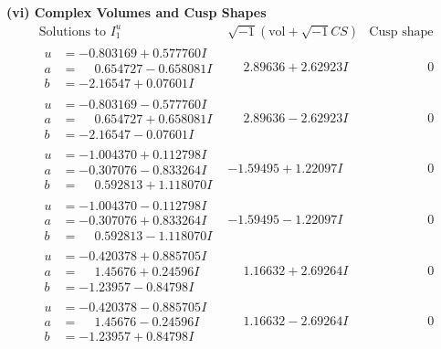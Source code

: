 \documentclass[1p]{elsarticle_modified}
\theoremstyle{definition}
\newcommand{\I}{\sqrt{-1}}
\begin{document}
\newpage\flushleft \textbf{(vi) Complex Volumes and Cusp Shapes}
$$\begin{array}{c|c|c}  
\text{Solutions to }I^u_{1}& \I (\text{vol} + \sqrt{-1}CS) & \text{Cusp shape}\\
 \hline 
\begin{aligned}
u &= -0.803169 + 0.577760 I \\
a &= \phantom{-}0.654727 - 0.658081 I \\
b &= -2.16547 + 0.07601 I\end{aligned}
 & \phantom{-}2.89636 + 2.62923 I & \phantom{-0.000000 } 0 \\ \hline\begin{aligned}
u &= -0.803169 - 0.577760 I \\
a &= \phantom{-}0.654727 + 0.658081 I \\
b &= -2.16547 - 0.07601 I\end{aligned}
 & \phantom{-}2.89636 - 2.62923 I & \phantom{-0.000000 } 0 \\ \hline\begin{aligned}
u &= -1.004370 + 0.112798 I \\
a &= -0.307076 - 0.833264 I \\
b &= \phantom{-}0.592813 + 1.118070 I\end{aligned}
 & -1.59495 + 1.22097 I & \phantom{-0.000000 } 0 \\ \hline\begin{aligned}
u &= -1.004370 - 0.112798 I \\
a &= -0.307076 + 0.833264 I \\
b &= \phantom{-}0.592813 - 1.118070 I\end{aligned}
 & -1.59495 - 1.22097 I & \phantom{-0.000000 } 0 \\ \hline\begin{aligned}
u &= -0.420378 + 0.885705 I \\
a &= \phantom{-}1.45676 + 0.24596 I \\
b &= -1.23957 - 0.84798 I\end{aligned}
 & \phantom{-}1.16632 + 2.69264 I & \phantom{-0.000000 } 0 \\ \hline\begin{aligned}
u &= -0.420378 - 0.885705 I \\
a &= \phantom{-}1.45676 - 0.24596 I \\
b &= -1.23957 + 0.84798 I\end{aligned}
 & \phantom{-}1.16632 - 2.69264 I & \phantom{-0.000000 } 0 \\ \hline\begin{aligned}

\end{aligned}
\end{array}$$
\end{document}
